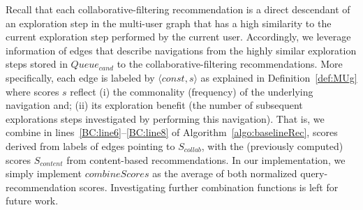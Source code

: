Recall that each collaborative-filtering recommendation is a direct descendant of an exploration step in the multi-user graph that has a high similarity to the current exploration step performed by the current user.
Accordingly, we leverage information of edges that describe navigations from the highly similar exploration steps stored in $Queue_{cand}$ to the collaborative-filtering recommendations.
More specifically, each edge is labeled by $\langle const, s \rangle$ as explained in Definition~\ref{def:MUg} where scores $s$ reflect (i) the commonality (frequency) of the underlying navigation and; (ii) its exploration benefit (the number of subsequent explorations steps investigated by performing this navigation).
That is, we combine in lines~\ref{BC:line6}--\ref{BC:line8} of Algorithm~\ref{algo:baselineRec}, scores derived from labels of edges pointing to $S_{collab}$, with the (previously computed) scores $S_{content}$ from content-based recommendations. 
In our implementation, we simply implement $combineScores$ as the average of both normalized query-recommendation scores. Investigating further combination functions is left for future work. 



